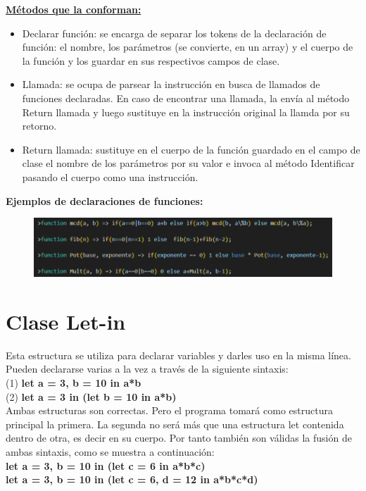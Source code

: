 \documentclass[12pt, letterpaper]{article}
\begin{document}
\textbf{\underline{Métodos que la conforman: }} 
\begin{itemize}
    \item Declarar función: se encarga de separar los tokens de la declaración de función: el nombre, los parámetros (se convierte, en un array) y el cuerpo de la función y los guardar en sus respectivos campos de clase.
    \item Llamada: se ocupa de parsear la instrucción en busca de llamados de funciones declaradas. En caso de encontrar una llamada, la envía al método Return llamada y luego sustituye en la instrucción original la llamda por su retorno. 
    \item Return llamada: sustituye en el cuerpo de la función guardado en el campo de clase el nombre de los parámetros por su valor e invoca al método Identificar pasando el cuerpo como una instrucción.
\end{itemize}

\textbf{Ejemplos de declaraciones de funciones:}\\
\begin{figure}[h]
    \centering
    \includegraphics[scale= 0.90]{T.png}
\end{figure}     
\newpage

\section{Clase Let-in}
Esta estructura se utiliza para declarar variables y darles uso en la misma línea. Pueden declararse varias a la vez a través de la siguiente sintaxis: \\
(1) \textbf{let a = 3, b = 10 in a*b} \\
(2) \textbf{let a = 3 in (let b = 10 in a*b)} \\

Ambas estructuras son correctas. Pero el programa tomará como estructura principal la primera. La segunda no será más que una estructura let contenida dentro de otra, es decir en su cuerpo. Por tanto también son válidas la fusión de ambas sintaxis, como se muestra a continuación:  \\

\textbf{let a = 3, b = 10 in (let c = 6  in a*b*c)}  \\
\textbf{let a = 3, b = 10 in (let c = 6, d = 12 in a*b*c*d)} \\
\end{document}
